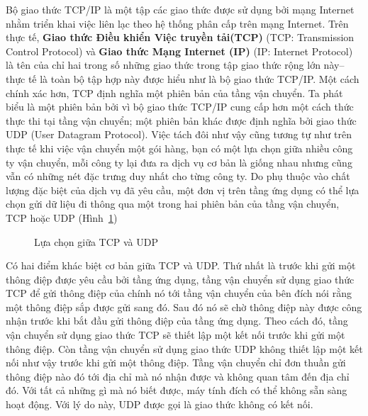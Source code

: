 Bộ giao thức TCP/IP là một tập các giao thức được sử dụng bởi mạng Internet nhằm triển
khai việc liên lạc theo hệ thống phân cấp trên mạng Internet. Trên thực tế, \textbf{Giao
  thức Điều khiển Việc truyền tải(TCP)} (TCP: Transmission Control Protocol) và
\textbf{Giao thức Mạng Internet (IP)} (IP: Internet Protocol) là tên của chỉ hai trong số
những giao thức trong tập giao thức rộng lớn này--thực tế là toàn bộ tập hợp này được hiểu
như là bộ giao thức TCP/IP. Một cách chính xác hơn, TCP định nghĩa một phiên bản của tầng
vận chuyển. Ta phát biểu là một phiên bản bởi vì bộ giao thức TCP/IP cung cấp hơn
một cách thức thực thi tại tầng vận chuyển; một phiên bản khác được định nghĩa bởi giao
thức UDP (User Datagram Protocol). Việc tách đôi như vậy cũng tương tự như trên thực tế
khi việc vận chuyển một gói hàng, bạn có một lựa chọn giữa nhiều công ty vận chuyển, mỗi
công ty lại đưa ra dịch vụ cơ bản là giống nhau nhưng cũng vẫn có những nét đặc trưng duy
nhất cho từng công ty. Do phụ thuộc vào chất lượng đặc biệt của dịch vụ đã yêu cầu, một
đơn vị trên tầng ứng dụng có thể lựa chọn gửi dữ liệu đi thông qua một trong hai phiên bản
của tầng vận chuyển, TCP hoặc UDP (Hình~\ref{fig:fig4.15})

\begin{figure} [tbh]
  \centering {}
  \caption{Lựa chọn giữa TCP và UDP}
  \label{fig:fig4.15}
\end{figure}


Có hai điểm khác biệt cơ bản giữa TCP và UDP. Thứ nhất là trước khi gửi một thông điệp
được yêu cầu bởi tầng ứng dụng, tầng vận chuyển sử dụng giao thức TCP để gửi thông điệp
của chính nó tới tầng vận chuyển của bên đích nói rằng một thông điệp sắp được gửi sang
đó. Sau đó nó sẽ chờ thông điệp này được công nhận trước khi bắt đầu gửi thông điệp của
tầng ứng dụng. Theo cách đó, tầng vận chuyển sử dụng giao thức TCP sẽ thiết lập một kết
nối trước khi gửi một thông điệp. Còn tầng vận chuyển sử dụng giao thức UDP không thiết
lập một kết nối như vậy trước khi gửi một thông điệp. Tầng vận chuyển chỉ đơn thuần gửi
thông điệp nào đó tới địa chỉ mà nó nhận được và không quan tâm đến địa chỉ đó. Với tất cả
những gì mà nó biết được, máy tính đích có thể không sẵn sàng hoạt động. Với lý do này,
UDP được gọi là giao thức không có kết nối.

